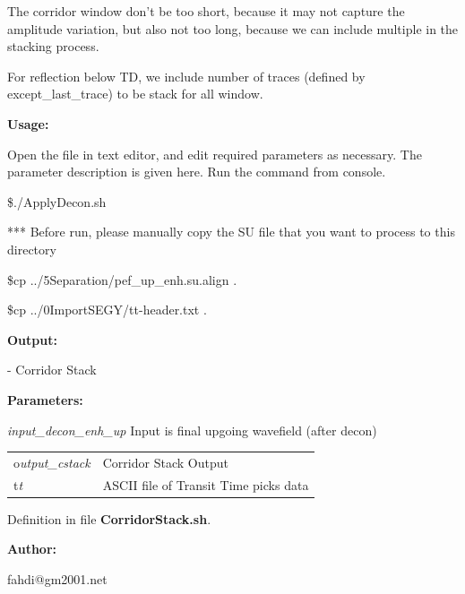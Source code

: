 \documentclass{article}
\begin{document}
\vspace{1pt}
The corridor window don't be too short, because it may not capture the amplitude 
variation, but also not too long, because we can include multiple in the stacking 
process. 

\vspace{1pt}
For reflection below TD, we include number of traces (defined by except\_last\_trace) 
to be stack for all window.

\vspace{16pt}
\textbf{Usage:}

\vspace{4pt}
Open the file in text editor, and edit required parameters as necessary. The parameter 
description is given here. Run the command from console. 

\vspace{4pt}
\$./ApplyDecon.sh 

\vspace{16pt}
*** Before run, please manually copy the SU file that you want to process to this 
directory 

\vspace{4pt}
\$cp ../5Separation/pef\_up\_enh.su.align .

\vspace{4pt}
\$cp ../0ImportSEGY/tt-header.txt .

\vspace{4pt}
\textbf{Output:}

\vspace{4pt}
- Corridor Stack

\vspace{4pt}
\textbf{Parameters:}

\vspace{4pt}
\textit{input\_decon\_enh\_up} Input is final upgoing wavefield (after decon) 

\vspace{4pt}
\begin{tabular}{|>{\raggedright}p{54pt}|>{\raggedright}p{245pt}|}
\hline
\tabularnewline
\hline
o\textit{utput\_cstack}  & Corridor Stack Output \tabularnewline
\hline
t\textit{t}  & ASCII file of Transit Time picks data \tabularnewline
\hline
\end{tabular}

\vspace{1pt}
Definition in file \textbf{CorridorStack.sh}.

\vspace{4pt}
\textbf{Author:}

\vspace{4pt}
\leftskip=18pt
fahdi@gm2001.net 
\end{document}
